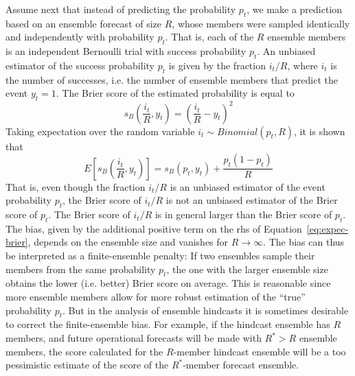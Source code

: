 \documentclass[article]{jss}\usepackage{graphicx, color}
\begin{document}
Assume next that instead of predicting the probability $p_t$, we make a prediction based on an ensemble forecast of size $R$, whose members were sampled identically and independently with probability $p_t$.
That is, each of the $R$ ensemble members is an independent Bernoulli trial with success probability $p_t$.
An unbiased estimator of the success probability $p_t$ is given by the fraction $i_t/R$, where $i_t$ is the number of successes, i.e. the number of ensemble members that predict the event $y_t=1$.
The Brier score of the estimated probability is equal to
%
\begin{equation}
s_{B}\left(\frac{i_t}{R}, y_t\right) = \left(\frac{i_t}{R} - y_t\right)^2
\label{eq:unfair-brier}
\end{equation}
%
Taking expectation over the random variable $i_t \sim Binomial(p_t, R)$, it is shown that \citep{ferro2008effect}
%
\begin{equation}
E\left[s_{B}\left(\frac{i_t}{R}, y_t\right)\right] = s_{B}(p_t, y_t) +\frac{p_t(1-p_t)}{R}
\label{eq:expec-brier}
\end{equation}
%
That is, even though the fraction $i_t/R$ is an unbiased estimator of the event probability $p_t$, the Brier score of $i_t/R$ is not an unbiased estimator of the Brier score of $p_t$.
The Brier score of $i_t/R$ is in general larger than the Brier score of $p_t$.
The bias, given by the additional positive term on the rhs of Equation~\ref{eq:expec-brier}, depends on the ensemble size and vanishes for $R\rightarrow\infty$.
The bias can thus be interpreted as a finite-ensemble penalty: If two ensembles sample their members from the same probability $p_t$, the one with the larger ensemble size obtains the lower (i.e. better) Brier score on average.
This is reasonable since more ensemble members allow for more robust estimation of the ``true'' probability $p_t$.
But in the analysis of ensemble hindcasts it is sometimes desirable to correct the finite-ensemble bias.
For example, if the hindcast ensemble has $R$ members, and future operational forecasts will be made with $R^* > R$ ensemble members, the score calculated for the $R$-member hindcast ensemble will be a too pessimistic estimate of the score of the $R^*$-member forecast ensemble.
\end{document}
